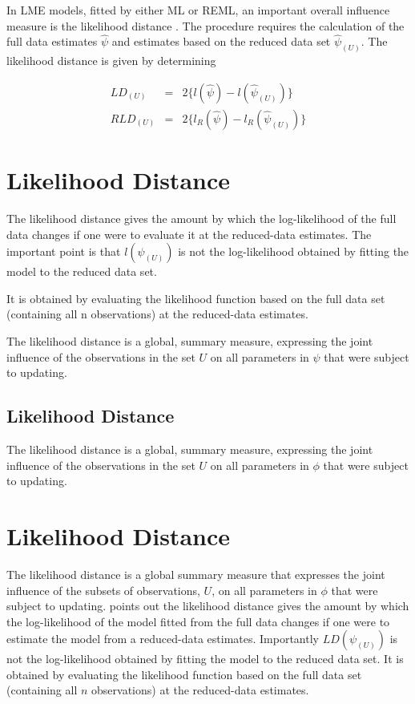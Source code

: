 \documentclass[12pt, a4paper]{article}
\begin{document}
	In LME models, fitted by either ML or REML, an important overall
	influence measure is the likelihood distance \citep{cook82}. The
	procedure requires the calculation of the full data estimates
	$\hat{\psi}$ and estimates based on the reduced data set
	$\hat{\psi}_{(U)}$. The likelihood distance is given by
	determining
	
	
	\begin{eqnarray}
	LD_{(U)} &=& 2\{l(\hat{\psi}) - l( \hat{\psi}_{(U)}) \}\\
	RLD_{(U)} &=& 2\{l_{R}(\hat{\psi}) - l_{R}(\hat{\psi}_{(U)})\}
	\end{eqnarray}



\newpage

\section{Likelihood Distance} %
The likelihood distance gives the amount by which the log-likelihood of the full data changes if one were
to evaluate it at the reduced-data estimates. The important point is that $l(\psi_{(U)})$ is not the log-likelihood
obtained by fitting the model to the reduced data set.

It is obtained by evaluating the likelihood function based on the full data set (containing all n observations) at the reduced-data estimates.

The likelihood distance is a global, summary measure, expressing the joint influence of the observations in
the set $U$ on all parameters in $\psi$  that were subject to updating.

\subsection{Likelihood Distance}

The  likelihood distance is a global, summary measure, expressing the joint influence of the observations in the set $U$ on all parameters in $\phi$  that were subject to updating.




\section{Likelihood Distance} %
The  likelihood distance is a global summary measure that expresses the joint influence of the subsets of observations, $U$, on all parameters in $\phi$ that were subject to updating. \citet{schab} points out the likelihood distance gives the amount by which the log-likelihood of the model fitted from the full data changes if one were
to estimate the model from a reduced-data estimates. Importantly $LD(\psi_{(U)})$ is not the log-likelihood obtained by fitting the model to the reduced data set. It is obtained by evaluating the likelihood function based on the full data set (containing all $n$ observations) at the reduced-data estimates.
\end{document}

